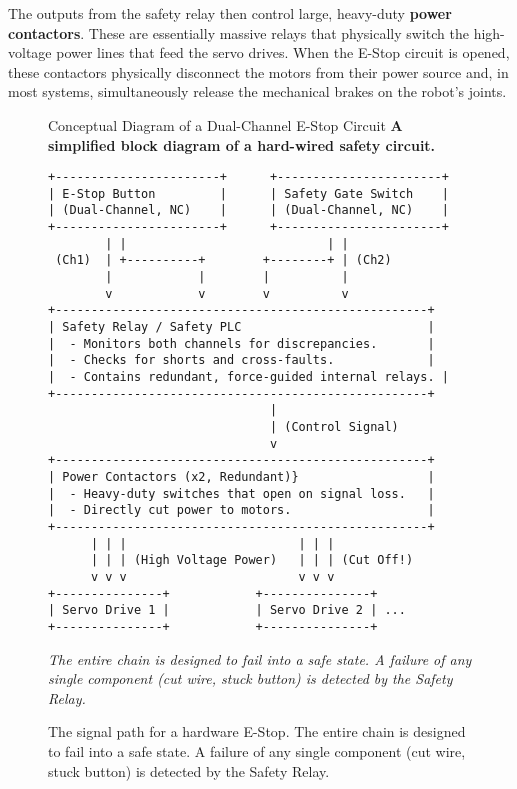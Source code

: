 The outputs from the safety relay then control large, heavy-duty \textbf{power contactors}. These are essentially massive relays that physically switch the high-voltage power lines that feed the servo drives. When the E-Stop circuit is opened, these contactors physically disconnect the motors from their power source and, in most systems, simultaneously release the mechanical brakes on the robot's joints.




\begin{figure}[h!] %
    \centering
        \begin{infobox}{Conceptual Diagram of a Dual-Channel E-Stop Circuit}
        \textbf{A simplified block diagram of a hard-wired safety circuit.}
        \begin{lstlisting}[language=Text, basicstyle=\ttfamily\small, columns=fixed, frame=none, numbers=none, showstringspaces=false, breaklines=false, breakatwhitespace=false, aboveskip=0pt, belowskip=0pt]
+-----------------------+      +-----------------------+
| E-Stop Button         |      | Safety Gate Switch    |
| (Dual-Channel, NC)    |      | (Dual-Channel, NC)    |
+-----------------------+      +-----------------------+
        | |                            | |
 (Ch1)  | +----------+        +--------+ | (Ch2)
        |            |        |          |
        v            v        v          v
+----------------------------------------------------+
| Safety Relay / Safety PLC                          |
|  - Monitors both channels for discrepancies.       |
|  - Checks for shorts and cross-faults.             |
|  - Contains redundant, force-guided internal relays. |
+----------------------------------------------------+
                               |
                               | (Control Signal)
                               v
+----------------------------------------------------+
| Power Contactors (x2, Redundant)}                  |
|  - Heavy-duty switches that open on signal loss.   |
|  - Directly cut power to motors.                   |
+----------------------------------------------------+
      | | |                        | | |
      | | | (High Voltage Power)   | | | (Cut Off!)
      v v v                        v v v
+---------------+            +---------------+
| Servo Drive 1 |            | Servo Drive 2 | ...
+---------------+            +---------------+
        \end{lstlisting}
        \vspace{0.2cm}
        \textit{The entire chain is designed to fail into a safe state. A failure of any single component (cut wire, stuck button) is detected by the Safety Relay.}
    \end{infobox}
    \caption{The signal path for a hardware E-Stop. The entire chain is designed to fail into a safe state. A failure of any single component (cut wire, stuck button) is detected by the Safety Relay.}
    \label{fig:estop_circuit}
\end{figure}

